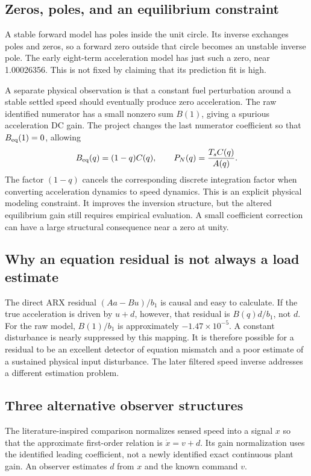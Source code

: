 \subsection{Zeros, poles, and an equilibrium constraint}
A stable forward model has poles inside the unit circle. Its inverse exchanges poles and zeros, so a forward zero outside that circle becomes an unstable inverse pole. The early eight-term acceleration model has just such a zero, near 1.00026356. This is not fixed by claiming that its prediction fit is high.

A separate physical observation is that a constant fuel perturbation around a stable settled speed should eventually produce zero acceleration. The raw identified numerator has a small nonzero sum $B(1)$, giving a spurious acceleration DC gain. The project changes the last numerator coefficient so that $B_{\rm eq}(1)=0$, allowing
\begin{equation}B_{\rm eq}(q)=(1-q)C(q),\qquad
P_N(q)=\frac{T_sC(q)}{A(q)}.
\end{equation}
The factor $(1-q)$ cancels the corresponding discrete integration factor when converting acceleration dynamics to speed dynamics. This is an explicit physical modeling constraint. It improves the inversion structure, but the altered equilibrium gain still requires empirical evaluation. A small coefficient correction can have a large structural consequence near a zero at unity.

\subsection{Why an equation residual is not always a load estimate}
The direct ARX residual $(Aa-Bu)/b_1$ is causal and easy to calculate. If the true acceleration is driven by $u+d$, however, that residual is $B(q)d/b_1$, not $d$. For the raw model, $B(1)/b_1$ is approximately $-1.47\times10^{-5}$. A constant disturbance is nearly suppressed by this mapping. It is therefore possible for a residual to be an excellent detector of equation mismatch and a poor estimate of a sustained physical input disturbance. The later filtered speed inverse addresses a different estimation problem.

\subsection{Three alternative observer structures}
The literature-inspired comparison normalizes sensed speed into a signal $x$ so that the approximate first-order relation is $\dot x=v+d$. Its gain normalization uses the identified leading coefficient, not a newly identified exact continuous plant gain. An observer estimates $d$ from $x$ and the known command $v$.

